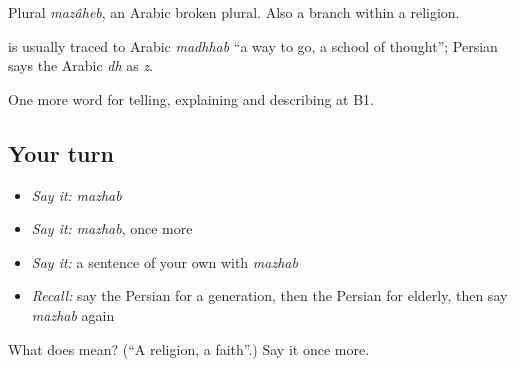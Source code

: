Plural \emph{mazâheb}, an Arabic broken plural. Also a branch within a religion.

\begin{cousinweb}
\textbf{} is usually traced to Arabic \emph{madhhab} \textquotedblleft{}a way to go, a school of thought\textquotedblright{}; Persian says the Arabic \emph{dh} as \emph{z}.
\end{cousinweb}

\begin{grammarlens}[title={What you've built}]
One more word for telling, explaining and describing at B1.
\end{grammarlens}

\subsection*{Your turn}
\begin{itemize}
\raggedright
  \item \emph{Say it:} \emph{mazhab}
  \item \emph{Say it:} \emph{mazhab}, once more
  \item \emph{Say it:} a sentence of your own with \emph{mazhab}
  \item \emph{Recall:} say the Persian for a generation, then the Persian for elderly, then say \emph{mazhab} again
\end{itemize}

\begin{tcolorbox}[breakable,colback=teal!4,colframe=teal!35!black,title={Before you move on}]
What does  mean? (\textquotedblleft{}A religion, a faith\textquotedblright{}.) Say it once more.
\end{tcolorbox}
